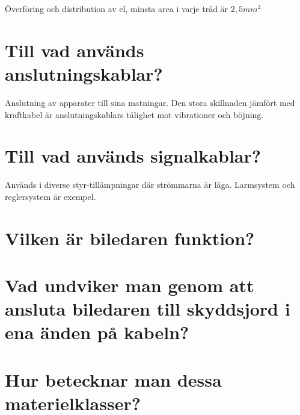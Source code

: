 \documentclass[a4paper,swedish]{article}
\begin{document}
Överföring och distribution av el, minsta area i varje tråd är $2,5 mm^2$

\setcounter{section}{24}
\section{Till vad används anslutningskablar?}

Anslutning av apparater till sina matningar. Den stora skillnaden jämfört med kraftkabel är anslutningskablars
tålighet mot vibrationer och böjning.

\setcounter{section}{26}
\section{Till vad används signalkablar?}

Används i diverse styr-tillämpningar där strömmarna är låga.
Larmsystem och reglersystem är exempel.

\setcounter{section}{28}
\section{Vilken är biledaren funktion?}

\setcounter{section}{30}
\section{Vad undviker man genom att ansluta biledaren till skyddsjord i ena änden på
kabeln?}

\setcounter{section}{32}
\section{Hur betecknar man dessa materielklasser?}
\end{document}
